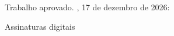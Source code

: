 
%
% 
%
\begin{folhadeaprovacao}

  \begin{center}
    {\ABNTEXchapterfont\large\imprimirautor}

    \vspace*{\fill}\vspace*{\fill}
    \begin{center}
      \ABNTEXchapterfont\bfseries\Large\imprimirtitulo
    \end{center}
    \vspace*{\fill}
    
    \hspace{.45\textwidth}
    \begin{minipage}{.5\textwidth}
        \imprimirpreambulo
    \end{minipage}%
    \vspace*{\fill}
   \end{center}
        
   Trabalho aprovado. \imprimirlocal, 17 de dezembro de 2026:

      
   \begin{center}
    \vspace*{0.5cm}
    {\large\imprimirlocal}
    \par
    {\large\imprimirdata}
    \vspace*{1cm}
  \end{center}
  
\end{folhadeaprovacao}

Assinaturas digitais
\newpage